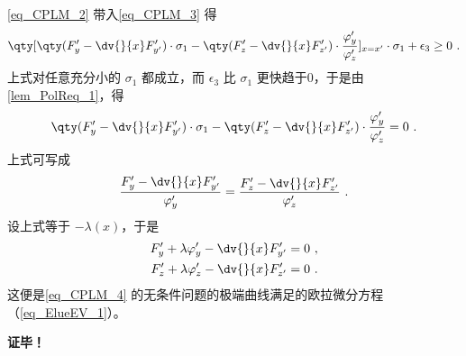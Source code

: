 \autoref{eq_CPLM_2} 带入\autoref{eq_CPLM_3} 得
\begin{equation}
\qty[\qty(F'_y-\dv{}{x}F'_{y'})\cdot\sigma_1-\qty(F'_z-\dv{}{x}F'_{z'})\cdot\frac{\varphi'_y}{\varphi'_z}]_{x=x'}\cdot\sigma_1+\epsilon_3\geq0~.
\end{equation}
上式对任意充分小的 $\sigma_1$ 都成立，而 $\epsilon_3$ 比 $\sigma_1$ 更快趋于0，于是由\autoref{lem_PolReq_1}，得
\begin{equation}
\qty(F'_y-\dv{}{x}F'_{y'})\cdot\sigma_1-\qty(F'_z-\dv{}{x}F'_{z'})\cdot\frac{\varphi'_y}{\varphi'_z}=0~.
\end{equation}
上式可写成
\begin{equation}
\frac{F'_y-\dv{}{x}F'_{y'}}{\varphi'_y}=\frac{F'_z-\dv{}{x}F'_{z'}}{\varphi'_z}~.
\end{equation}
设上式等于 $-\lambda(x)$，于是
\begin{equation}
\begin{aligned}
F'_y+\lambda\varphi'_y-\dv{}{x}F'_{y'}=0~,\\
F'_z+\lambda\varphi'_z-\dv{}{x}F'_{z'}=0~.
\end{aligned}
\end{equation}
这便是\autoref{eq_CPLM_4} 的无条件问题的极端曲线满足的欧拉微分方程（\autoref{eq_ElueEV_1}）。



\textbf{证毕！}
